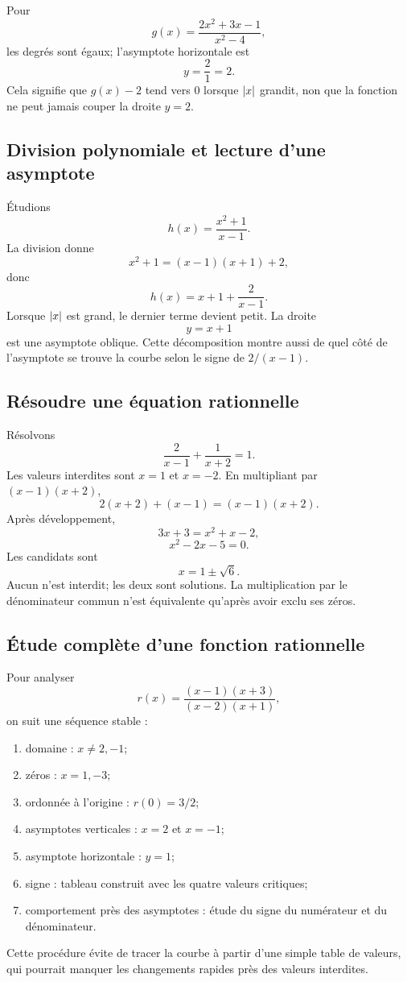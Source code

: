 \begin{examplebox}
Pour
\[
g(x)=\frac{2x^2+3x-1}{x^2-4},
\]
les degrés sont égaux; l'asymptote horizontale est
\[
y=\frac21=2.
\]
Cela signifie que $g(x)-2$ tend vers $0$ lorsque $\left\lvert x\right\rvert$ grandit, non que la fonction ne peut jamais couper la droite $y=2$.
\end{examplebox}

\subsection{Division polynomiale et lecture d'une asymptote}

Étudions
\[
h(x)=\frac{x^2+1}{x-1}.
\]
La division donne
\[
x^2+1=(x-1)(x+1)+2,
\]
donc
\[
h(x)=x+1+\frac{2}{x-1}.
\]
Lorsque $\left\lvert x\right\rvert$ est grand, le dernier terme devient petit. La droite
\[
y=x+1
\]
est une asymptote oblique. Cette décomposition montre aussi de quel côté de l'asymptote se trouve la courbe selon le signe de $2/(x-1)$.

\subsection{Résoudre une équation rationnelle}

Résolvons
\[
\frac{2}{x-1}+\frac{1}{x+2}=1.
\]
Les valeurs interdites sont $x=1$ et $x=-2$. En multipliant par $(x-1)(x+2)$,
\[
2(x+2)+(x-1)=(x-1)(x+2).
\]
Après développement,
\[
3x+3=x^2+x-2,
\]
\[
x^2-2x-5=0.
\]
Les candidats sont
\[
x=1\pm\sqrt6.
\]
Aucun n'est interdit; les deux sont solutions. La multiplication par le dénominateur commun n'est équivalente qu'après avoir exclu ses zéros.

\subsection{Étude complète d'une fonction rationnelle}

Pour analyser
\[
r(x)=\frac{(x-1)(x+3)}{(x-2)(x+1)},
\]
on suit une séquence stable :
\begin{enumerate}
\item domaine : $x\neq2,-1$;
\item zéros : $x=1,-3$;
\item ordonnée à l'origine : $r(0)=3/2$;
\item asymptotes verticales : $x=2$ et $x=-1$;
\item asymptote horizontale : $y=1$;
\item signe : tableau construit avec les quatre valeurs critiques;
\item comportement près des asymptotes : étude du signe du numérateur et du dénominateur.
\end{enumerate}
Cette procédure évite de tracer la courbe à partir d'une simple table de valeurs, qui pourrait manquer les changements rapides près des valeurs interdites.

